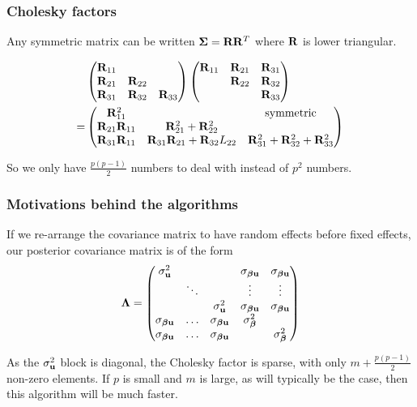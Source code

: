 \documentclass{beamer}
\begin{document}
\begin{frame}
\frametitle{Cholesky factors}
Any symmetric matrix can be written ${\boldsymbol \Sigma} = {\bf R} {\bf R}^T$
where ${\bf R}$ is lower triangular.

\begin{align*}
&\begin{pmatrix}
{\bf R}_{11} \\
{\bf R}_{21} & {\bf R}_{22} \\
{\bf R}_{31} & {\bf R}_{32} & {\bf R}_{33}
\end{pmatrix}
\begin{pmatrix}
{\bf R}_{11} & {\bf R}_{21} & {\bf R}_{31} \\
& {\bf R}_{22} & {\bf R}_{32} \\
& & {\bf R}_{33}
\end{pmatrix}
\\
=& \begin{pmatrix}
{\bf R}_{11}^2 & & \text{symmetric}\\
{\bf R}_{21}{\bf R}_{11} & {\bf R}_{21}^2 + {\bf R}_{22}^2 \\
{\bf R}_{31} {\bf R}_{11} & {\bf R}_{31}{\bf R}_{21} + {\bf R}_{32}L_{22} & {\bf R}_{31}^2 + {\bf R}_{32} ^2 + {\bf R}_{33}^2
\end{pmatrix}
\end{align*}

So we only have $\frac{p(p-1)}{2}$ numbers to deal with instead of
$p^2$ numbers.

\end{frame}

\begin{frame}
\frametitle{Motivations behind the algorithms}
If we re-arrange the covariance matrix to have random effects before
fixed effects, our posterior covariance matrix is of the form
\begin{align*} {\boldsymbol\Lambda} =
\begin{pmatrix}
\sigma_{\bf u}^2 & & & \sigma_{{\boldsymbol \beta} {\bf u}} & \sigma_{{\boldsymbol \beta} {\bf u}} \\
& \ddots & & \vdots & \vdots \\
& & \sigma_{\bf u}^2 & \sigma_{{\boldsymbol \beta} {\bf u}} & \sigma_{{\boldsymbol \beta} {\bf u}} \\
\sigma_{{\boldsymbol \beta} {\bf u}} & \ldots & \sigma_{{\boldsymbol \beta} {\bf u}} & \sigma_{\boldsymbol \beta}^2 \\
\sigma_{{\boldsymbol \beta} {\bf u}} & \ldots &\sigma_{{\boldsymbol \beta} {\bf u}}  & & \sigma_{\boldsymbol \beta}^2
\end{pmatrix}
\end{align*}

As the $\sigma_{\bf u}^2$ block is diagonal, the Cholesky factor is 
sparse, with only $m + \frac{p(p-1)}{2}$ non-zero elements. If $p$ is small
and $m$ is large, as will typically be the case, then this algorithm will
be much faster.

\end{frame}
\end{document}

